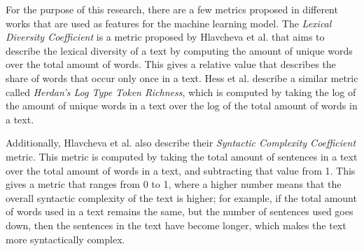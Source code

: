 \documentclass{article}
\begin{document}
For the purpose of this research, there are a few metrics proposed in different works that are used as features for the machine learning model.
The \textit{Lexical Diversity Coefficient} is a metric proposed by Hlavcheva et al. \cite{hlavcheva2021languageindependentfeatures} that aims to describe the lexical diversity of a text by computing the amount of unique words over the total amount of words.
This gives a relative value that describes the share of words that occur only once in a text.
Hess et al. \cite{hess1989reliabilitytypetoken} describe a similar metric called \textit{Herdan's Log Type Token Richness}, which is computed by taking the log of the amount of unique words in a text over the log of the total amount of words in a text.

Additionally, Hlavcheva et al. also describe their \textit{Syntactic Complexity Coefficient} metric.
This metric is computed by taking the total amount of sentences in a text over the total amount of words in a text, and subtracting that value from 1.
This gives a metric that ranges from 0 to 1, where a higher number means that the overall syntactic complexity of the text is higher; for example, if the total amount of words used in a text remains the same, but the number of sentences used goes down, then the sentences in the text have become longer, which makes the text more syntactically complex.
\end{document}
